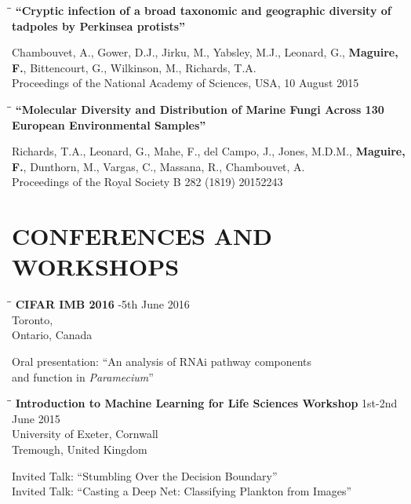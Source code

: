 \documentclass{res}
\begin{document}
\begin{resume}
\vspace{-0.2in}
\begin{tabbing}
   \hspace{2.3in}\= \hspace{2.6in}\= \kill
   {\bf ``Cryptic infection of a broad taxonomic and geographic diversity of tadpoles by Perkinsea protists''}
   \end{tabbing}\vspace{-20pt}
   Chambouvet, A., Gower, D.J., Jirku, M., Yabsley, M.J., Leonard, G., \textbf{Maguire, F.}, Bittencourt, G., Wilkinson, M., Richards, T.A.\\
Proceedings of the National Academy of Sciences, USA, 10 August 2015

\vspace{-0.1in}
\begin{tabbing}
   \hspace{2.3in}\= \hspace{2.6in}\= \kill
   {\bf ``Molecular Diversity and Distribution of Marine Fungi Across 130 European Environmental Samples''}
   \end{tabbing}\vspace{-20pt}
   Richards, T.A., Leonard, G., Mahe, F., del Campo, J., Jones, M.D.M., \textbf{Maguire, F.}, Dunthorn, M., Vargas, C., Massana, R., Chambouvet, A.\\
Proceedings of the Royal Society B 282 (1819) 20152243

\section{CONFERENCES AND WORKSHOPS}
  \vspace{-0.05in}

\begin{tabbing}
\hspace{2in}\= \hspace{2.6in}\= \kill
{\bf CIFAR IMB 2016} \> -5th June 2016\\
\> \> Toronto,  \\
\> \> Ontario, Canada \\
\end{tabbing}\vspace{-40pt}
Oral presentation: ``An analysis of RNAi pathway components \\
and function in \textit{Paramecium}''\\

\vspace{-0.1in}
\begin{tabbing}
\hspace{2in}\= \hspace{2.6in}\= \kill
{\bf Introduction to Machine Learning for Life Sciences Workshop} \> \> 1st-2nd June 2015\\
\> \>University of Exeter, Cornwall \\
\> \> Tremough, United Kingdom\\
\end{tabbing}\vspace{-40pt}
Invited Talk: ``Stumbling Over the Decision Boundary''\\
Invited Talk: ``Casting a Deep Net: Classifying Plankton from Images''


\end{resume}
\end{document}
